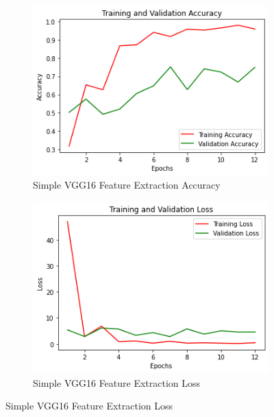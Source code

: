 \begin{figure}[H]
	\begin{subfigure}{0.5\textwidth}
		\includegraphics[width=0.9\linewidth]{img/vgg16/vgg16fe1acc.png} 
		\caption{Simple VGG16 Feature Extraction Accuracy}
		\label{fig:vgg16fe1acc}
	\end{subfigure}
	\begin{subfigure}{0.5\textwidth}
		\includegraphics[width=0.9\linewidth]{img/vgg16/vgg16fe1loss.png}
		\caption{Simple VGG16 Feature Extraction Loss}
		\label{fig:vgg16fe1loss}
	\end{subfigure}
\end{figure}

